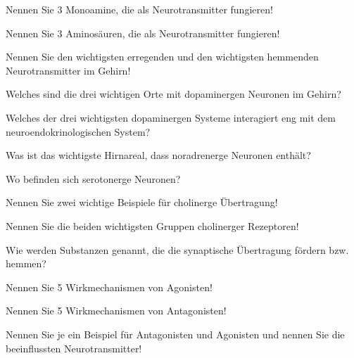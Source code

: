 \documentclass[10pt, a4paper]{exam}
\begin{document}
\begin{questions}
\begin{solution}
  \end{solution}
  \question Nennen Sie 3 Monoamine, die als Neurotransmitter fungieren!
  \begin{solution}
  \end{solution}
  \question Nennen Sie 3 Aminosäuren, die als Neurotransmitter fungieren!
  \begin{solution}
  \end{solution}
  \question Nennen Sie den wichtigsten erregenden und den wichtigsten hemmenden Neurotransmitter im Gehirn!
  \begin{solution}
  \end{solution}
  \question Welches sind die drei wichtigen Orte mit dopaminergen Neuronen im Gehirn?
  \begin{solution}
  \end{solution}
  \question Welches der drei wichtigsten dopaminergen Systeme interagiert eng mit dem neuroendokrinologischen System?
  \begin{solution}
  \end{solution}
  \question Was ist das wichtigste Hirnareal, dass noradrenerge Neuronen enthält?
  \begin{solution}
  \end{solution}
  \question Wo befinden sich serotonerge Neuronen?
  \begin{solution}
  \end{solution}
  \question Nennen Sie zwei wichtige Beispiele für cholinerge Übertragung!
  \begin{solution}
  \end{solution}
  \question Nennen Sie die beiden wichtigsten Gruppen cholinerger Rezeptoren!
  \begin{solution}
  \end{solution}
  \question Wie werden Substanzen genannt, die die synaptische Übertragung fördern bzw. hemmen?
  \begin{solution}
  \end{solution}
  \question Nennen Sie 5 Wirkmechanismen von Agonisten!
  \begin{solution}
  \end{solution}
  \question Nennen Sie 5 Wirkmechanismen von Antagonisten!
  \begin{solution}
  \end{solution}
  \question Nennen Sie je ein Beispiel für Antagonisten und Agonisten und nennen Sie die beeinflussten Neurotransmitter!
  \begin{solution}
  \end{solution}

\end{questions}
\end{document}
